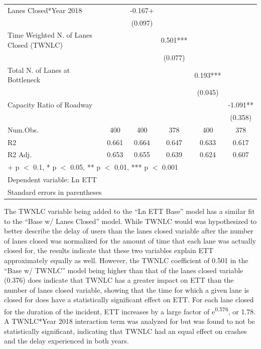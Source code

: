 \documentclass[
  letterpaper,
  authoryear]{elsarticle}
\begin{document}
\begin{table}
{\begin{tabular}[t]{lccccc}
Lanes Closed*Year 2018 &  & -0.167+ &  &  & \\
 &  & (0.097) &  &  & \\
Time Weighted N. of Lanes Closed (TWNLC) &  &  & 0.501*** &  & \\
 &  &  & (0.077) &  & \\
Total N. of Lanes at Bottleneck &  &  &  & 0.193*** & \\
 &  &  &  & (0.045) & \\
Capacity Ratio of Roadway &  &  &  &  & -1.091**\\
 &  &  &  &  & (0.358)\\
\midrule
Num.Obs. & 400 & 400 & 378 & 400 & 378\\
R2 & 0.661 & 0.664 & 0.647 & 0.633 & 0.617\\
R2 Adj. & 0.653 & 0.655 & 0.639 & 0.624 & 0.607\\
\bottomrule
\multicolumn{6}{l}{\rule{0pt}{1em}+ p $<$ 0.1, * p $<$ 0.05, ** p $<$ 0.01, *** p $<$ 0.001}\\
\multicolumn{6}{l}{\rule{0pt}{1em}Dependent variable: Ln ETT}\\
\multicolumn{6}{l}{\rule{0pt}{1em}Standard errors in parentheses}\\
\end{tabular}

}

\end{table}%

The TWNLC variable being added to the ``Ln ETT Base'' model has a
similar fit to the ``Base w/ Lanes Closed'' model. While TWNLC would was
hypothesized to better describe the delay of users than the lanes closed
variable after the number of lanes closed was normalized for the amount
of time that each lane was actually closed for, the results indicate
that these two variables explain ETT approximately equally as well.
However, the TWNLC coefficient of 0.501 in the ``Base w/ TWNLC'' model
being higher than that of the lanes closed variable (0.376) does
indicate that TWNLC has a greater impact on ETT than the number of lanes
closed variable, showing that the time for which a given lane is closed
for does have a statistically significant effect on ETT. For each lane
closed for the duration of the incident, ETT increases by a large factor
of e\textsuperscript{0.576}, or 1.78. A TWNLC*Year 2018 interaction term
was analyzed for but was found to not be statistically significant,
indicating that TWNLC had an equal effect on crashes and the delay
experienced in both years.
\end{document}
